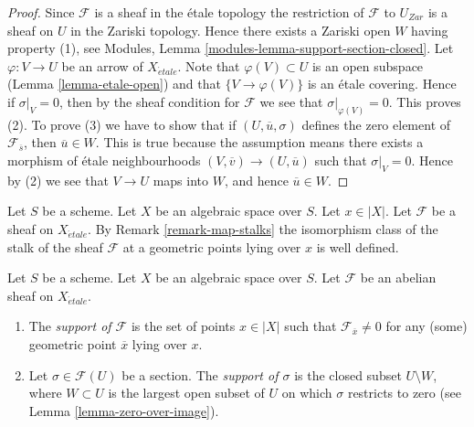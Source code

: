 \begin{proof}
Since $\mathcal{F}$ is a sheaf in the \'etale topology the restriction of
$\mathcal{F}$ to $U_{Zar}$ is a sheaf on $U$ in the Zariski topology.
Hence there exists a Zariski open $W$ having property (1), see
Modules, Lemma \ref{modules-lemma-support-section-closed}. Let
$\varphi : V \to U$ be an arrow of $X_{\acute{e}tale}$. Note that
$\varphi(V) \subset U$ is an open subspace
(Lemma \ref{lemma-etale-open})
and that $\{V \to \varphi(V)\}$ is an \'etale covering. Hence if
$\sigma|_V = 0$, then by the sheaf condition for $\mathcal{F}$ we
see that $\sigma|_{\varphi(V)} = 0$. This proves (2).
To prove (3) we have to show that if $(U, \overline{u}, \sigma)$
defines the zero element of $\mathcal{F}_{\overline{s}}$, then
$\overline{u} \in W$. This is true because the assumption means
there exists a morphism of \'etale neighbourhoods
$(V, \overline{v}) \to (U, \overline{u})$ such that
$\sigma|_V = 0$. Hence by (2) we see that $V \to U$ maps into $W$, and
hence $\overline{u} \in W$.
\end{proof}

\noindent
Let $S$ be a scheme.
Let $X$ be an algebraic space over $S$.
Let $x \in |X|$.
Let $\mathcal{F}$ be a sheaf on $X_{\acute{e}tale}$. By
Remark \ref{remark-map-stalks}
the isomorphism class of the stalk of the sheaf $\mathcal{F}$
at a geometric points lying over $x$ is well defined.

\begin{definition}
\label{definition-support}
Let $S$ be a scheme.
Let $X$ be an algebraic space over $S$.
Let $\mathcal{F}$ be an abelian sheaf on $X_{\acute{e}tale}$.
\begin{enumerate}
\item The {\it support of $\mathcal{F}$} is the set of
points $x \in |X|$ such that $\mathcal{F}_{\overline{x}} \not = 0$
for any (some) geometric point $\overline{x}$ lying over $x$.
\item Let $\sigma \in \mathcal{F}(U)$ be a section.
The {\it support of $\sigma$} is the closed subset $U \setminus W$, where
$W \subset U$ is the largest open subset of $U$ on which $\sigma$
restricts to zero (see
Lemma \ref{lemma-zero-over-image}).
\end{enumerate}
\end{definition}

